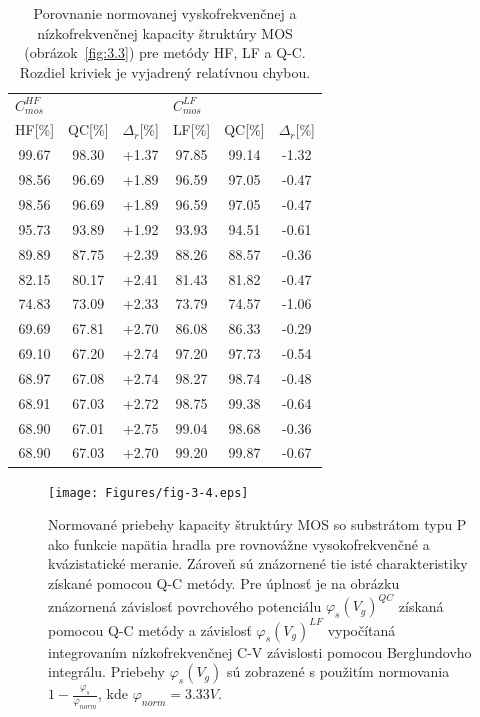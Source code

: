 \begin{table}[h!]\centering
  \begin{tabular}{c c c c c c}
    \multicolumn{3}{l}{$C^{HF}_{mos}$} & \multicolumn{3}{l}{$C^{LF}_{mos}$} \\
    HF[\%] & QC[\%] & $\Delta_r$[\%] & LF[\%] & QC[\%] & $\Delta_r$[\%] \\
    \hline%
    99.67 & 98.30 & +1.37 & 97.85 & 99.14 & -1.32 \\
    98.56 & 96.69 & +1.89 & 96.59 & 97.05 & -0.47 \\
    98.56 & 96.69 & +1.89 & 96.59 & 97.05 & -0.47 \\
    95.73 & 93.89 & +1.92 & 93.93 & 94.51 & -0.61 \\
    89.89 & 87.75 & +2.39 & 88.26 & 88.57 & -0.36 \\
    82.15 & 80.17 & +2.41 & 81.43 & 81.82 & -0.47 \\
    74.83 & 73.09 & +2.33 & 73.79 & 74.57 & -1.06 \\
    69.69 & 67.81 & +2.70 & 86.08 & 86.33 & -0.29 \\
    69.10 & 67.20 & +2.74 & 97.20 & 97.73 & -0.54 \\
    68.97 & 67.08 & +2.74 & 98.27 & 98.74 & -0.48 \\
    68.91 & 67.03 & +2.72 & 98.75 & 99.38 & -0.64 \\
    68.90 & 67.01 & +2.75 & 99.04 & 98.68 & -0.36 \\
    68.90 & 67.03 & +2.70 & 99.20 & 99.87 & -0.67 \\
  \end{tabular}
  \caption[Porovnanie normovanej vyskofrekvenčnej a nízkofrekvenčnej
    kapacity štruktúry MOS (obrázok~\ref{fig:3.3}) pre metódy HF, LF a
    Q-C]{Porovnanie normovanej vyskofrekvenčnej a nízkofrekvenčnej
    kapacity štruktúry MOS (obrázok~\ref{fig:3.3}) pre metódy HF, LF a
    Q-C. Rozdiel kriviek je vyjadrený relatívnou chybou.}\label{tab:3.1}
\end{table}

\newline
\begin{figure}[h!]\centering
  \texttt{[image: Figures/fig-3-4.eps]}
  \caption[Normované priebehy kapacity štruktúry MOS so substrátom typu
  P ako funkcie napätia hradla pre rovnovážne vysokofrekvenčné a
  kvázistatické meranie]{Normované priebehy kapacity štruktúry MOS so
  substrátom typu P ako funkcie napätia hradla pre rovnovážne
  vysokofrekvenčné a kvázistatické meranie.  Zároveň sú znázornené tie
  isté charakteristiky získané pomocou Q-C metódy. Pre úplnosť je na
  obrázku znázornená závislosť povrchového potenciálu
  ${\varphi_s(V_g)}^{QC}$ získaná pomocou Q-C metódy a závislosť
  ${\varphi_s(V_g)}^{LF}$ vypočítaná integrovaním nízkofrekvenčnej C-V
  závislosti pomocou Berglundovho integrálu.  Priebehy
  $\varphi_s(V_g)$ sú zobrazené s použitím normovania $1 -
  \frac{\varphi_s}{\varphi_{norm}}$, kde $\varphi_{norm}=3.33V$.}\label{fig:3.4}
\end{figure}

